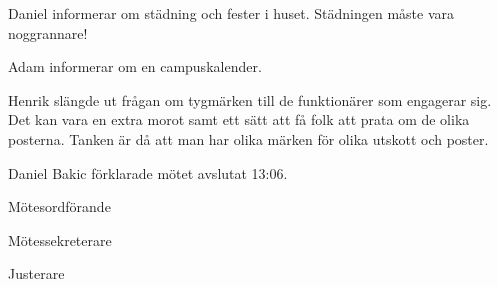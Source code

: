 \documentclass[10pt]{article}
\def\mo{Daniel Bakic}
\def\ms{Axel Voss}
\def\ji{Isabella Hansen}
\begin{document}
\begin{paragrafer}

  Daniel informerar om städning och fester i huset. Städningen måste vara noggrannare!

  Adam informerar om en campuskalender.

  Henrik slängde ut frågan om tygmärken till de funktionärer som engagerar sig. Det kan vara en extra morot samt ett sätt att få folk att prata om de olika posterna. Tanken är då att man har olika märken för olika utskott och poster.

{\mo} förklarade mötet avslutat 13:06.
\end{paragrafer}

\hidesignfoot
\begin{signatures}{3}
\signature{\mo}{Mötesordförande}
\signature{\ms}{Mötessekreterare}
\signature{\ji}{Justerare}
\end{signatures}
\end{document}
